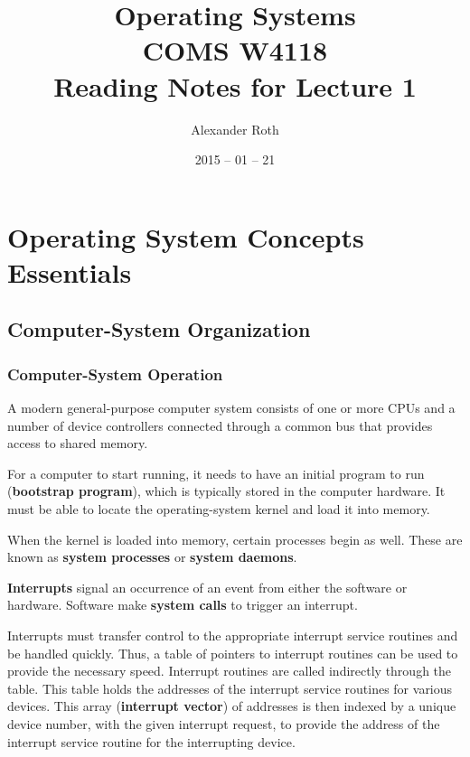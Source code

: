 \documentclass[]{article}
\begin{document}
\newtheorem{thm}{Theorem}
\title{Operating Systems \\ COMS W4118 \\ Reading Notes for Lecture 1}
\author{Alexander Roth}
\date{2015 -- 01 -- 21}
\maketitle



\section*{Operating System Concepts Essentials}

\subsection*{Computer-System Organization}

\subsubsection*{Computer-System Operation}
A modern general-purpose computer system consists of one or more CPUs and a
number of device controllers connected through a common bus that provides access
to shared memory.

For a computer to start running, it needs to have an initial program to run
(\textbf{bootstrap program}), which is typically stored in the computer
hardware. It must be able to locate the operating-system kernel and load it into
memory.

When the kernel is loaded into memory, certain processes begin as well. These
are known as \textbf{system processes} or \textbf{system daemons}.

\textbf{Interrupts} signal an occurrence of an event from either the software or
hardware. Software make \textbf{system calls} to trigger an interrupt.

Interrupts must transfer control to the appropriate interrupt service routines
and be handled quickly. Thus, a table of pointers to interrupt routines can be
used to provide the necessary speed. Interrupt routines are called indirectly
through the table. This table holds the addresses of the interrupt service
routines for various devices. This array (\textbf{interrupt vector}) of
addresses is then indexed by a unique device number, with the given interrupt
request, to provide the address of the interrupt service routine for the
interrupting device.
\end{document}
